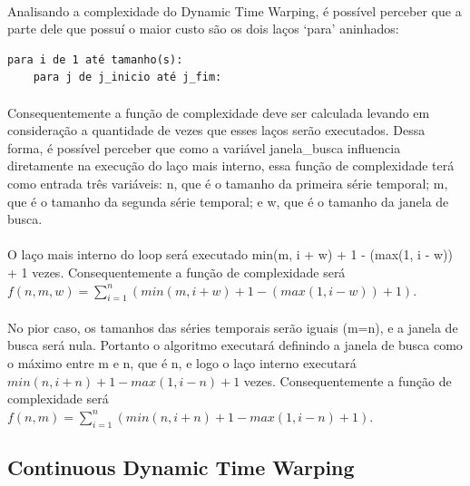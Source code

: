 \documentclass[12pt]{article}
\begin{document}
\paragraph{}Analisando a complexidade do Dynamic Time Warping, é possível perceber que a parte dele que possuí o maior custo são os dois laços ‘para’ aninhados:

\begin{verbatim}
para i de 1 até tamanho(s):
    para j de j_inicio até j_fim:
\end{verbatim}

\paragraph{}Consequentemente a função de complexidade deve ser calculada levando em consideração a quantidade de vezes que esses laços serão executados. Dessa forma, é possível perceber que como a variável janela\_busca influencia diretamente na execução do laço mais interno, essa função de complexidade terá como entrada três variáveis: n, que é o tamanho da primeira série temporal; m, que é o tamanho da segunda série temporal; e w, que é o tamanho da janela de busca.

\paragraph{}O laço mais interno do loop será executado min(m, i + w) + 1 - (max(1, i - w)) + 1 vezes. Consequentemente a função de complexidade será $f(n, m, w) = \sum_{i=1}^{n}(min(m, i + w) + 1 - (max(1, i - w)) + 1)$.

\paragraph{}No pior caso, os tamanhos das séries temporais serão iguais (m=n), e a janela de busca será nula. Portanto o algoritmo executará definindo a janela de busca como o máximo entre m e n, que é n, e logo o laço interno executará $min(n, i + n) + 1 - max(1, i - n) + 1$ vezes. Consequentemente a função de complexidade será $f(n, m) = \sum_{i=1}^{n} (min(n, i + n) + 1 - max(1, i - n) + 1)$.



\subsection{Continuous Dynamic Time Warping}
\end{document}
